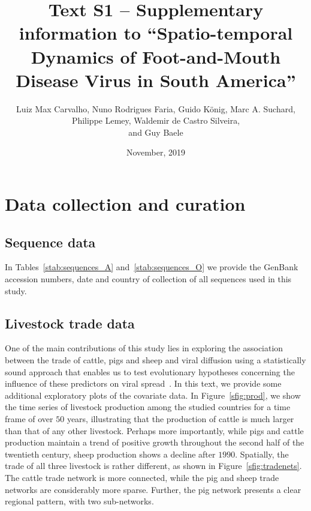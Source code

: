 \documentclass[a4paper,10pt]{article}
\title{Text S1 -- Supplementary information to ``Spatio-temporal Dynamics of Foot-and-Mouth Disease Virus in South America''}
\author{
Luiz Max Carvalho, Nuno Rodrigues Faria, Guido K\"onig,
Marc A. Suchard,\\ 
Philippe Lemey, Waldemir de Castro Silveira,\\
and Guy Baele
}
\date{November, 2019}
\begin{document}
\maketitle

\section*{Data collection and curation}

\subsection*{Sequence data}

In Tables~\ref{stab:sequences_A} and~\ref{stab:sequences_O} we provide the GenBank accession numbers, date and country of collection of all sequences used in this study.

\subsection*{Livestock trade data}

One of the main contributions of this study lies in exploring the association between the trade of cattle, pigs and sheep and viral diffusion using a statistically sound approach that enables us to test evolutionary hypotheses concerning the influence of these predictors on viral spread~\citep{M-Lemey2014}. %
In this text, we provide some additional exploratory plots of the covariate data.
In Figure~\ref{sfig:prod}, we show the time series of livestock production among the studied countries for a time frame of over $50$ years, illustrating that the production of cattle is much larger than that of any other livestock. %
Perhaps more importantly, while pigs and cattle production maintain a trend of positive growth throughout the second half of the twentieth century, sheep production shows a decline after $1990$.
Spatially, the trade of all three livestock is rather different, as shown in Figure~\ref{sfig:tradenets}. %
The cattle trade network is more connected, while the pig and sheep trade networks are considerably more sparse.
Further, the pig network presents a clear regional pattern, with two sub-networks. %
\end{document}
